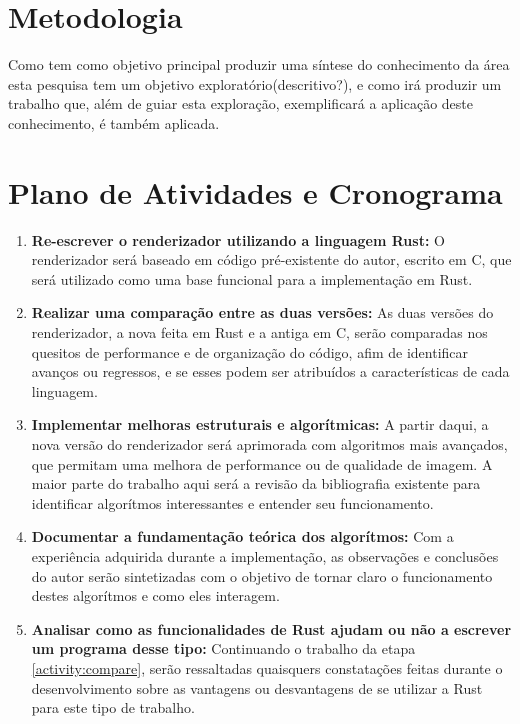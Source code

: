 \documentclass[12pt]{article}
\def\Cpp{{C\nolinebreak[4]\raisebox{.20ex}{\small\bf++}}}
\newcommand{\todo}[1]{\textsf{\color{red}#1}}
\begin{document}
\section{Metodologia}

Como tem como objetivo principal produzir uma síntese do conhecimento da área esta pesquisa tem um
objetivo exploratório\todo{(descritivo?)}, e como irá produzir um trabalho que, além de guiar esta
exploração, exemplificará a aplicação deste conhecimento, é também aplicada.

\section{Plano de Atividades e Cronograma}

\begin{enumerate}
	\item \label{activity:rewrite} \textbf{Re-escrever o renderizador utilizando a linguagem Rust:}
		O renderizador será baseado em código pré-existente do autor, escrito em \Cpp, que será
		utilizado como uma base funcional para a implementação em Rust.
	\item \label{activity:compare} \textbf{Realizar uma comparação entre as duas versões:}
		As duas versões do renderizador, a nova feita em Rust e a antiga em \Cpp, serão comparadas
		nos quesitos de performance e de organização do código, afim de identificar avanços ou
		regressos, e se esses podem ser atribuídos a características de cada linguagem.
	\item \label{activity:improve} \textbf{Implementar melhoras estruturais e algorítmicas:}
		A partir daqui, a nova versão do renderizador será aprimorada com algoritmos mais avançados,
		que permitam uma melhora de performance ou de qualidade de imagem. A maior parte do trabalho
		aqui será a revisão da bibliografia existente para identificar algorítmos interessantes e
		entender seu funcionamento.
	\item \label{activity:document} \textbf{Documentar a fundamentação teórica dos algorítmos:}
		Com a experiência adquirida durante a implementação, as observações e conclusões do autor
		serão sintetizadas com o objetivo de tornar claro o funcionamento destes algorítmos e como
		eles interagem.
	\item \label{activity:analysis} \textbf{Analisar como as funcionalidades de Rust ajudam ou não a escrever um programa desse tipo:}
		Continuando o trabalho da etapa \ref{activity:compare}, serão ressaltadas quaisquers
		constatações feitas durante o desenvolvimento sobre as vantagens ou desvantagens de se
		utilizar a Rust para este tipo de trabalho.
\end{enumerate}
\end{document}

